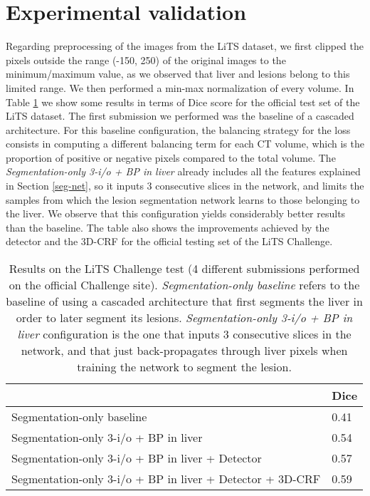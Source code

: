 \documentclass{article}
\begin{document}
\section{Experimental validation}

Regarding preprocessing of the images from the LiTS dataset, we first clipped the pixels outside the range (-150, 250) of the original images to the minimum/maximum value, as we observed that liver and lesions belong to this limited range. We then performed a min-max normalization of every volume. In Table \ref{Table:test} we show some results in terms of Dice score for the official test set of the LiTS dataset. The first submission we performed was the baseline of a cascaded architecture. For this baseline configuration, the balancing strategy for the loss consists in computing a different balancing term for each CT volume, which is the proportion of positive or negative pixels compared to the total volume. The \textit{Segmentation-only 3-i/o + BP in liver} already includes all the features explained in Section \ref{seg-net}, so it inputs 3 consecutive slices in the network, and limits the samples from which the lesion segmentation network learns to those belonging to the liver. We observe that this configuration yields considerably better results than the baseline. The table also shows the improvements achieved by the detector and the 3D-CRF for the official testing set of the LiTS Challenge. 

\begin{table}[]
\centering
\begin{tabular}{l|l}
                                                            & Dice \\ \hline
Segmentation-only baseline                      & 0.41       \\
Segmentation-only 3-i/o + BP in liver                    & 0.54       \\
Segmentation-only 3-i/o + BP in liver + Detector            & 0.57       \\
Segmentation-only 3-i/o + BP in liver + Detector + 3D-CRF & 0.59      
\bigskip
\end{tabular}
\caption{Results on the LiTS Challenge test (4 different submissions performed on the official Challenge site). \textit{Segmentation-only baseline} refers to the baseline of using a cascaded architecture that first segments the liver in order to later segment its lesions. \textit{Segmentation-only 3-i/o + BP in liver } configuration is the one that inputs 3 consecutive slices in the network, and that just back-propagates through liver pixels when training the network to segment the lesion.}
\label{Table:test}
\end{table}
\end{document}
